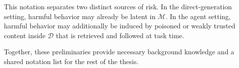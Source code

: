 This notation separates two distinct sources of risk.
In the direct-generation setting, harmful behavior may 
already be latent in $\mathcal{M}$.
In the agent setting, harmful behavior may additionally be induced by
poisoned or weakly trusted content inside $\mathcal{D}$ that 
is retrieved and followed at task time.

Together, these preliminaries provide necessary background knowledge 
and a shared notation list for the rest of
 the thesis.
